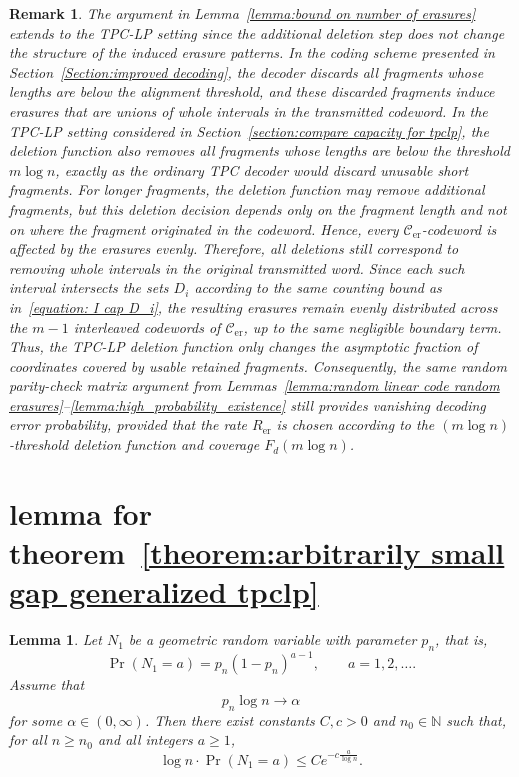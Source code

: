 \documentclass[journal,letterpaper,onecolumn,11pt]{IEEEtran}
\newtheorem{remark}{Remark}
\newtheorem{lemma}{Lemma}
\begin{document}
\begin{remark}\label{remark:tpclp_erasure_patterns}
The argument in Lemma~\ref{lemma:bound on number of erasures} extends to the
TPC-LP setting since the additional deletion step does not change the
structure of the induced erasure patterns. 
In the coding scheme presented in Section~\ref{Section:improved decoding}, the decoder discards all fragments whose lengths are below the alignment
threshold, and these discarded fragments induce erasures that are unions of
whole intervals in the transmitted codeword. 
In the TPC-LP setting considered in Section~\ref{section:compare capacity for tpclp}, the deletion function also removes all fragments whose lengths are below
the threshold $m\log n$, exactly as the ordinary TPC decoder would discard
unusable short fragments. 
For longer fragments, the deletion function may remove additional fragments,
but this deletion decision depends only on the fragment length and not on where
the fragment originated in the codeword. Hence, every $\mathcal{C}_{\mathrm{er}}$-codeword is affected by the erasures evenly.
Therefore, all deletions still correspond to
removing whole intervals in the original transmitted word. Since each such
interval intersects the sets $D_i$ according to the same counting bound as
in~\eqref{equation: I cap D_i}, the resulting erasures remain evenly
distributed across the $m-1$ interleaved codewords  of
$\mathcal{C}_{\mathrm{er}}$, up to the same negligible boundary term. Thus, the
TPC-LP deletion function only changes the asymptotic fraction of coordinates
covered by usable retained fragments. Consequently, the same random
parity-check matrix argument from Lemmas~\ref{lemma:random linear code random erasures}--\ref{lemma:high_probability_existence} still provides vanishing decoding error probability,
provided that the rate $R_{\mathrm{er}}$ is chosen according to the $(m\log n)$-threshold deletion function and coverage $F_d(m\log n)$. 
\end{remark}


\section{lemma for theorem~\ref{theorem:arbitrarily small gap generalized tpclp}}\label{section:lemma useful for thm2}
\begin{lemma}\label{lemma:geometric-envelope}
Let \(N_1\) be a geometric random variable with parameter \(p_n\), that is,
\[
    \Pr(N_1=a)=p_n(1-p_n)^{a-1},\qquad a=1,2,\ldots .
\]
Assume that
\[
    p_n\log n\to \alpha
\]
for some \(\alpha\in(0,\infty)\). Then there exist constants \(C,c>0\) and \(n_0\in\mathbb N\) such that, for all \(n\ge n_0\) and all integers \(a\ge 1\),
\[
    \log n\cdot \Pr(N_1=a)
    \le
    Ce^{-c\frac{a}{\log n}}.
\]
\end{lemma}
\end{document}
